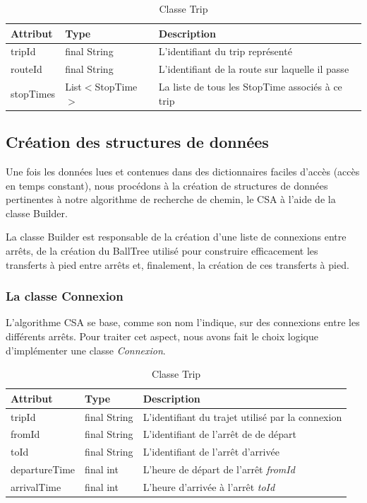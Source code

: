 \documentclass[12pt]{article}
\begin{document}
\begin{table}[h]
    \centering
    \begin{tabular}{|l|l|p{8cm}|}
    \hline
    \textbf{Attribut} & \textbf{Type} & \textbf{Description} \\
    \hline
    tripId & final String & L'identifiant du trip représenté \\
    routeId & final String & L'identifiant de la route sur laquelle il passe \\
    stopTimes & List$<$StopTime$>$ &  La liste de tous les StopTime associés à ce trip \\
    \hline
    \end{tabular}
    \caption{Classe Trip}
\end{table}

\subsection{Création des structures de données}
Une fois les données lues et contenues dans des dictionnaires faciles d'accès (accès en temps constant), nous procédons à la création de structures de données
pertinentes à notre algorithme de recherche de chemin, le CSA à l'aide de la classe Builder.

La classe Builder est responsable de la création d'une liste de connexions entre arrêts, de la création du BallTree utilisé pour construire efficacement les transferts à pied entre arrêts
et, finalement, la création de ces transferts à pied.

\subsubsection{La classe Connexion}
\label{sec:connexion}
L'algorithme CSA se base, comme son nom l'indique, sur des connexions entre les différents arrêts. Pour traiter cet aspect, nous avons fait le choix logique
d'implémenter une classe \emph{Connexion}.

\begin{table}[h]
    \centering
    \begin{tabular}{|l|l|p{8cm}|}
    \hline
    \textbf{Attribut} & \textbf{Type} & \textbf{Description} \\
    \hline
    tripId & final String & L'identifiant du trajet utilisé par la connexion \\
    fromId & final String & L'identifiant de l'arrêt de de départ \\
    toId & final String &  L'identifiant de l'arrêt d'arrivée \\
    departureTime & final int & L'heure de départ de l'arrêt \emph{fromId} \\
    arrivalTime & final int & L'heure d'arrivée à l'arrêt \emph{toId} \\
    \hline
    \end{tabular}
    \caption{Classe Trip}
\end{table}
\end{document}
